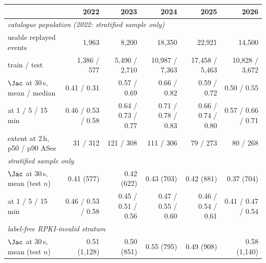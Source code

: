 \begin{tabular}{lrrrrr}
\toprule
 & 2022 & 2023 & 2024 & 2025 & 2026 \\
\midrule
\multicolumn{6}{l}{\emph{catalogue population (2022: stratified sample only)}} \\
usable replayed events & 1,963 & 8,200 & 18,350 & 22,921 & 14,500 \\
train / test & 1,386 / 577 & 5,490 / 2,710 & 10,987 / 7,363 & 17,458 / 5,463 & 10,828 / 3,672 \\
$\Jac$ at 30\,s, mean / median & 0.41 / 0.31 & 0.57 / 0.69 & 0.66 / 0.82 & 0.59 / 0.72 & 0.50 / 0.55 \\
at 1 / 5 / 15\,min & 0.46 / 0.53 / 0.58 & 0.64 / 0.73 / 0.77 & 0.71 / 0.78 / 0.83 & 0.66 / 0.74 / 0.80 & 0.57 / 0.66 / 0.71 \\
extent at 2\,h, p50 / p90 ASes & 31 / 312 & 121 / 308 & 111 / 306 & 79 / 273 & 80 / 268 \\
\midrule
\multicolumn{6}{l}{\emph{stratified sample only}} \\
$\Jac$ at 30\,s, mean (test $n$) & 0.41 (577) & 0.42 (622) & 0.43 (703) & 0.42 (881) & 0.37 (704) \\
at 1 / 5 / 15\,min & 0.46 / 0.53 / 0.58 & 0.45 / 0.51 / 0.56 & 0.47 / 0.55 / 0.60 & 0.46 / 0.54 / 0.61 & 0.41 / 0.47 / 0.54 \\
\midrule
\multicolumn{6}{l}{\emph{label-free RPKI-invalid stratum}} \\
$\Jac$ at 30\,s, mean (test $n$) & 0.51 (1,128) & 0.50 (851) & 0.55 (795) & 0.49 (908) & 0.58 (1,140) \\
\bottomrule
\end{tabular}
